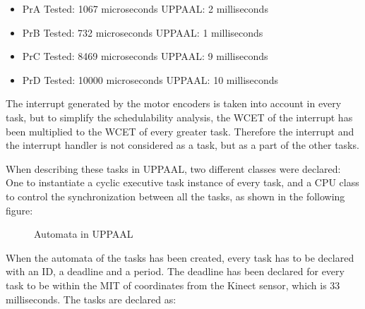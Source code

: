 \begin{itemize}
	\item PrA \tab Tested: 1067 microseconds \tab UPPAAL: 2 milliseconds
	\item PrB \tab Tested: 732  microseconds \tab UPPAAL: 1 milliseconds
	\item PrC \tab Tested: 8469 microseconds \tab UPPAAL: 9 milliseconds
	\item PrD \tab Tested: 10000 microseconds \tab UPPAAL: 10 milliseconds
\end{itemize}

The interrupt generated by the motor encoders is taken into account in every task, but to simplify the schedulability analysis, the WCET of the interrupt has been multiplied to the WCET of every greater task. Therefore the interrupt and the interrupt handler is not considered as a task, but as a part of the other tasks.

When describing these tasks in UPPAAL, two different classes were declared: One to instantiate a cyclic executive task instance of every task, and a CPU class to control the synchronization between all the tasks, as shown in the following figure:

\begin{figure}[h]
	\centering
	\caption{Automata in UPPAAL}
	\label{UppaalModelAutomata}
\end{figure}

When the automata of the tasks has been created, every task has to be declared with an ID, a deadline and a period. The deadline has been declared for every task to be within the MIT of coordinates from the Kinect sensor, which is 33 milliseconds.
The tasks are declared as:

